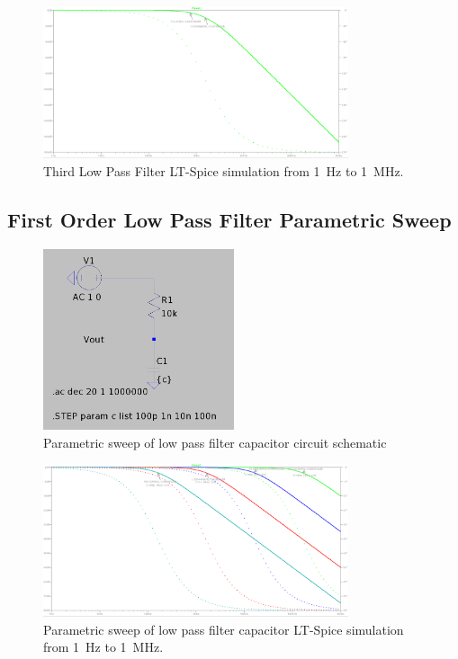\documentclass[CMPE]{../KGCOEReport}
\begin{document}
	\begin{figure}[ht]
		\centering
		\includegraphics[width=0.8\textwidth]{third_order}
		\caption{Third Low Pass Filter LT-Spice simulation from \SI{1}{\Hz} to \SI{1}{\mega\Hz}.}
		\label{fig:third_order}
	\end{figure}

	\pagebreak

	\subsection*{First Order Low Pass Filter Parametric Sweep}
	\begin{figure}[ht]
		\centering
		\includegraphics[width=0.5\textwidth]{low_pass_c_sweep_schem}
		\caption{Parametric sweep of low pass filter capacitor circuit schematic}
		\label{fig:parametric_sweep_schem}
	\end{figure}

	\begin{figure}[ht]
		\centering
		\includegraphics[width=0.8\textwidth]{low_pass_c_sweep}
		\caption{Parametric sweep of low pass filter capacitor LT-Spice simulation from \SI{1}{\Hz} to \SI{1}{\mega\Hz}.}
		\label{fig:parametric_sweep}
	\end{figure}
\end{document}

